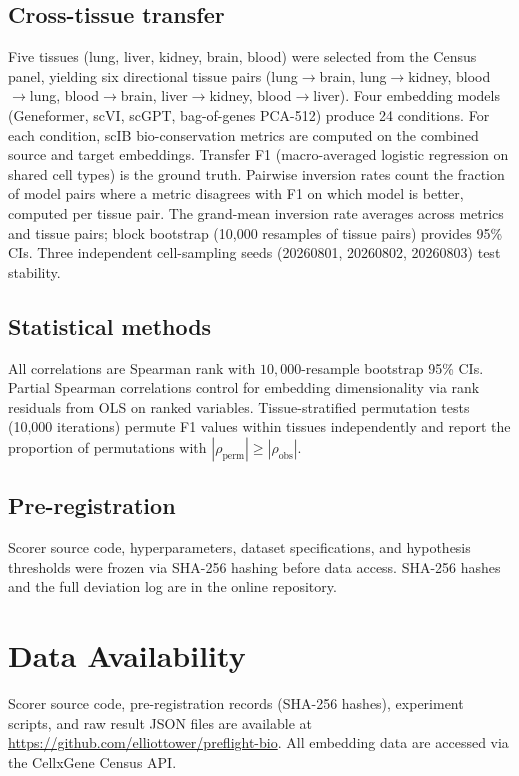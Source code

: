 \documentclass[11pt]{article}
\begin{document}
\subsection{Cross-tissue transfer}
\label{sec:crosstissuemethod}

Five tissues (lung, liver, kidney, brain, blood) were selected from the
Census panel, yielding six directional tissue pairs (lung$\to$brain,
lung$\to$kidney, blood$\to$lung, blood$\to$brain, liver$\to$kidney,
blood$\to$liver). Four embedding models (Geneformer, scVI, scGPT,
bag-of-genes PCA-512) produce 24 conditions. For each condition, scIB
bio-conservation metrics are computed on the combined source and target
embeddings. Transfer F1 (macro-averaged logistic regression on shared
cell types) is the ground truth. Pairwise inversion rates count the
fraction of model pairs where a metric disagrees with F1 on which model
is better, computed per tissue pair. The grand-mean inversion rate
averages across metrics and tissue pairs; block bootstrap (10,000
resamples of tissue pairs) provides 95\% CIs. Three independent
cell-sampling seeds (20260801, 20260802, 20260803) test stability.

\subsection{Statistical methods}

All correlations are Spearman rank with $10{,}000$-resample bootstrap
95\% CIs. Partial Spearman correlations control for embedding
dimensionality via rank residuals from OLS on ranked variables.
Tissue-stratified permutation tests (10,000 iterations) permute F1
values within tissues independently and report the proportion of
permutations with $|\rho_{\mathrm{perm}}| \geq |\rho_{\mathrm{obs}}|$.

\subsection{Pre-registration}

Scorer source code, hyperparameters, dataset specifications, and
hypothesis thresholds were frozen via SHA-256 hashing before data
access. SHA-256 hashes and the full deviation log are in the online
repository.


\section*{Data Availability}

Scorer source code, pre-registration records (SHA-256 hashes),
experiment scripts, and raw result JSON files are available at
\url{https://github.com/elliottower/preflight-bio}. All embedding data
are accessed via the CellxGene Census API.
\end{document}
